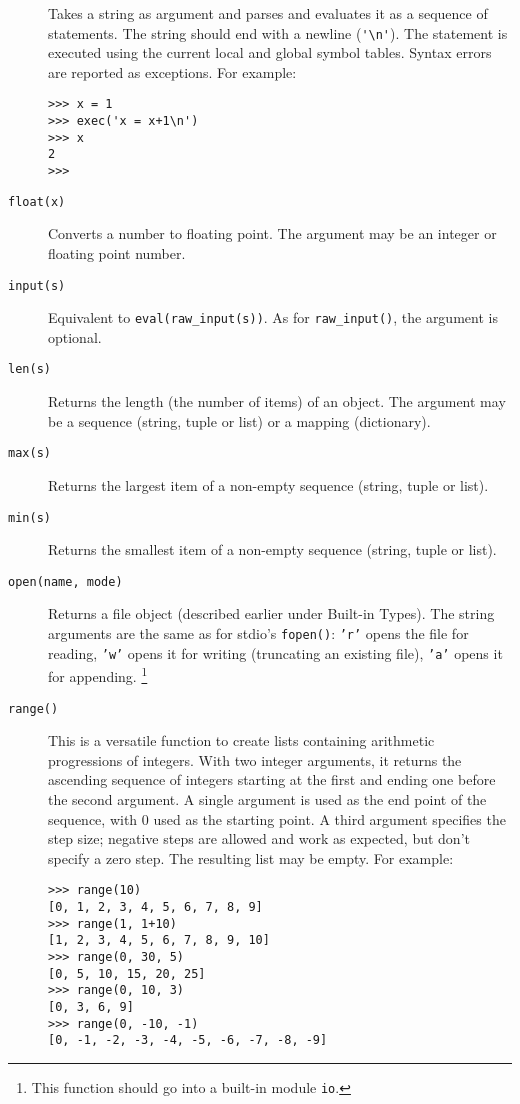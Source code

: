 \begin{description}
Takes a string as argument and parses and evaluates it as a sequence of
{\Python} statements.
The string should end with a newline (\verb"'\n'").
The statement is executed using the current local and global symbol
tables.
Syntax errors are reported as exceptions.
For example:
\begin{code}\begin{verbatim}
>>> x = 1
>>> exec('x = x+1\n')
>>> x
2
>>> 
\end{verbatim}\end{code}
\item[{\tt float(x)}]
Converts a number to floating point.
The argument may be an integer or floating point number.
\item[{\tt input(s)}]
Equivalent to
{\tt eval(raw\_input(s))}.
As for
{\tt raw\_input()},
the argument is optional.
\item[{\tt len(s)}]
Returns the length (the number of items) of an object.
The argument may be a sequence (string, tuple or list) or a mapping
(dictionary).
\item[{\tt max(s)}]
Returns the largest item of a non-empty sequence (string, tuple or list).
\item[{\tt min(s)}]
Returns the smallest item of a non-empty sequence (string, tuple or list).
\item[{\tt open(name, mode)}]
Returns a file object (described earlier under Built-in Types).
The string arguments are the same as for stdio's
{\tt fopen()}:
{\tt 'r'}
opens the file for reading,
{\tt 'w'}
opens it for writing (truncating an existing file),
{\tt 'a'}
opens it for appending.%
\footnote{
This function should go into a built-in module
{\tt io}.
}
\item[{\tt range()}]
This is a versatile function to create lists containing arithmetic
progressions of integers.
With two integer arguments, it returns the ascending sequence of
integers starting at the first and ending one before the second
argument.
A single argument is used as the end point of the sequence, with 0 used
as the starting point.
A third argument specifies the step size; negative steps are allowed and
work as expected, but don't specify a zero step.
The resulting list may be empty.
For example:
\begin{code}\begin{verbatim}
>>> range(10)
[0, 1, 2, 3, 4, 5, 6, 7, 8, 9]
>>> range(1, 1+10)
[1, 2, 3, 4, 5, 6, 7, 8, 9, 10]
>>> range(0, 30, 5)
[0, 5, 10, 15, 20, 25]
>>> range(0, 10, 3)
[0, 3, 6, 9]
>>> range(0, -10, -1)
[0, -1, -2, -3, -4, -5, -6, -7, -8, -9]

\end{verbatim}
\end{code}
\end{description}
